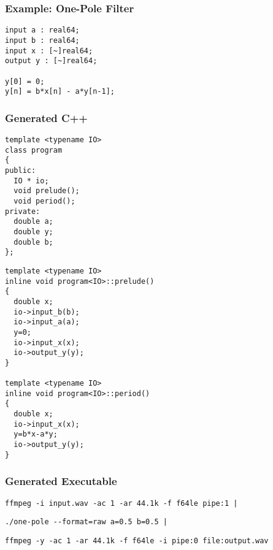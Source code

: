 \documentclass{beamer}
\begin{document}
\begin{frame}[fragile]
\frametitle{Example: One-Pole Filter}

\centering

\begin{BVerbatim}
input a : real64;
input b : real64;
input x : [~]real64;
output y : [~]real64;

y[0] = 0;
y[n] = b*x[n] - a*y[n-1];
\end{BVerbatim}

\end{frame}


\begin{frame}[fragile]
\frametitle{Generated C++}

\footnotesize
\begin{minipage}{0.49\linewidth}
\begin{BVerbatim}
template <typename IO>
class program
{
public:
  IO * io;
  void prelude();
  void period();
private:
  double a;
  double y;
  double b;
};
\end{BVerbatim}
\end{minipage}\hfill
\begin{minipage}{0.49\linewidth}
\begin{BVerbatim}
template <typename IO>
inline void program<IO>::prelude()
{
  double x;
  io->input_b(b);
  io->input_a(a);
  y=0;
  io->input_x(x);
  io->output_y(y);
}

template <typename IO>
inline void program<IO>::period()
{
  double x;
  io->input_x(x);
  y=b*x-a*y;
  io->output_y(y);
}
\end{BVerbatim}
\end{minipage}

\end{frame}


\begin{frame}[fragile]
\frametitle{Generated Executable}

\small

\begin{Verbatim}
ffmpeg -i input.wav -ac 1 -ar 44.1k -f f64le pipe:1 |
\end{Verbatim}

{
\bf
\begin{Verbatim}
./one-pole --format=raw a=0.5 b=0.5 |
\end{Verbatim}
}

\begin{Verbatim}
ffmpeg -y -ac 1 -ar 44.1k -f f64le -i pipe:0 file:output.wav
\end{Verbatim}

\end{frame}
\end{document}
